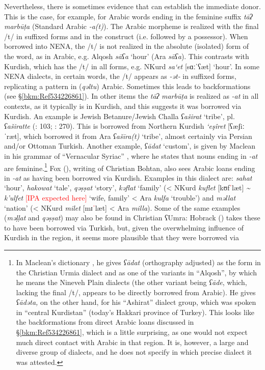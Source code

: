 \documentclass[output=paper]{langsci/langscibook}
\begin{document}
Nevertheless, there is sometimes evidence that can establish the immediate donor. This is the case, for example, for Arabic words ending in the feminine suffix \textit{tāʔ} \textit{marbūṭa} (Standard Arabic \textit{{}-a(t)}). The Arabic morpheme is realized with the final /t/ in suffixed forms and in the construct (i.e. followed by a possessor). When borrowed into NENA, the /t/ is not realized in the absolute (isolated) form of the word, as in Arabic, e.g. Alqosh \textit{sāʕa} ‘hour’ (Ara \textit{sāʕa}). This contrasts with Kurdish, which has the /t/ in all forms, e.g. NKurd \textit{sa‘et} [sɑːˈʕæt] ‘hour’. In some NENA dialects, in certain words, the /t/ appears as \textit{{}-ət-} in suffixed forms, replicating a pattern in (\textit{qəltu}) Arabic. Sometimes this leads to backformations (see §\ref{bkm:Ref534226861}). In other items the \textit{tāʔ} \textit{marbūṭa} is realized as \textit{{}-at} in all contexts, as it typically is in Kurdish, and this suggests it was borrowed via Kurdish. An example is Jewish Betanure/Jewish Challa \textit{ʕaširat} ‘tribe’, pl. \textit{ʕaširatte} (\citealt{Mutzafi2008}: 103; \citealt{Fassberg2010}: 270). This is borrowed from Northern Kurdish \textit{‘eşîret} [ʕæʃiːˈræt], which borrowed it from Ara \textit{ʕašīra(t)} ‘tribe’, almost certainly via Persian and/or Ottoman Turkish. Another example, \textit{ʕādat} ‘custom’, is given by Maclean in his grammar of ``Vernacular Syriac'' \citep[35]{Maclean1895}, where he states that nouns ending in \textit{\nobreakdash-at} are feminine.\footnote{\textrm{In Maclean’s dictionary} \textrm{\citep[235]{Maclean1901}, he gives} \textrm{\textit{ʕādat} }\textrm{(orthography adjusted)}\textrm{ }\textrm{as the form in the Christian Urmia dialect and as one of the variants in ``Alqosh'', by which he means the Nineveh Plain dialects (the other variant being} \textrm{\textit{ʕāde}}\textrm{, which, lacking the final /t/, appears to be directly borrowed from Arabic). He gives} \textrm{\textit{ʕādəta,}} \textrm{on the other hand, for his ``Ashirat'' dialect group, which was spoken in ``central Kurdistan'' (today’s Hakkari province of Turkey). This looks like the backformations from direct Arabic loans discussed in §\ref{bkm:Ref534226861}, which is a little surprising, as one would not expect much direct contact with Arabic in that region. It is, however, a large and diverse group of dialects, and he does not specify in which precise dialect it was attested.}} Fox (\citeyear[91]{Fox2009}), writing of Christian Bohtan, also sees Arabic loans ending in \textit{{}-at} as having been borrowed via Kurdish. Examples in this dialect are: \textit{sahat} ‘hour’, \textit{hakowat} ‘tale’, \textit{qəṣṣat} ‘story’, \textit{kəflat} ‘family’ (< NKurd \textit{kuflet} [kʊf\kern 1pt\textcolor{red}{ˈ}læt] \textit{{\textasciitilde} k’ulfet} \textcolor{red}{[IPA expected here]} ‘wife, family’ < Ara \textit{kulfa} ‘trouble’) and \textit{məllat} ‘nation’ (< NKurd \textit{milet} [mɪ\textcolor{red}{ˈ}læt] < Ara \textit{milla}). Some of the same examples (\textit{məḷḷat} and \textit{qəṣṣat}) may also be found in Christian ʕUmra: Hobrack (\citeyear[108]{Hobrack2000}) takes these to have been borrowed via Turkish, but, given the overwhelming influence of Kurdish in the region, it seems more plausible that they were borrowed via 
\end{document}
